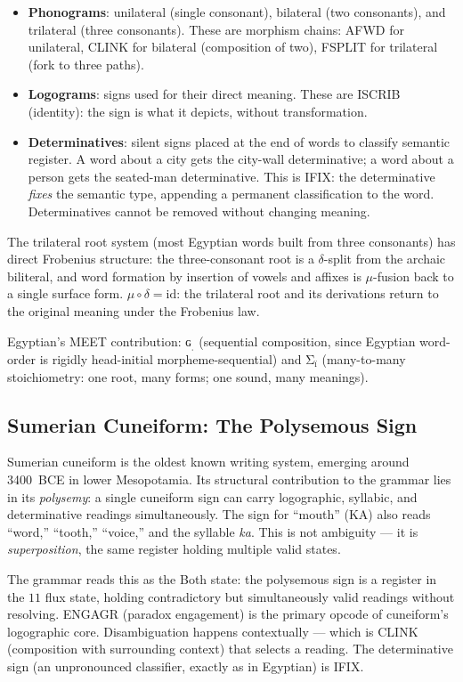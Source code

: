 \documentclass[12pt,a4paper]{article}
\begin{document}
\begin{itemize}
\item \textbf{Phonograms}: unilateral (single consonant), bilateral (two consonants), and trilateral (three consonants). These are morphism chains: AFWD for unilateral, CLINK for bilateral (composition of two), FSPLIT for trilateral (fork to three paths).
\item \textbf{Logograms}: signs used for their direct meaning. These are ISCRIB (identity): the sign is what it depicts, without transformation.
\item \textbf{Determinatives}: silent signs placed at the end of words to classify semantic register. A word about a city gets the city-wall determinative; a word about a person gets the seated-man determinative. This is IFIX: the determinative \emph{fixes} the semantic type, appending a permanent classification to the word. Determinatives cannot be removed without changing meaning.
\end{itemize}

The trilateral root system (most Egyptian words built from three consonants) has direct Frobenius structure: the three-consonant root is a $\delta$-split from the archaic biliteral, and word formation by insertion of vowels and affixes is $\mu$-fusion back to a single surface form. $\mu \circ \delta = \mathrm{id}$: the trilateral root and its derivations return to the original meaning under the Frobenius law.

Egyptian's MEET contribution: $\text{ɢ}_\text{ˌ}$ (sequential composition, since Egyptian word-order is rigidly head-initial morpheme-sequential) and $\text{Σ}_\text{ï}$ (many-to-many stoichiometry: one root, many forms; one sound, many meanings).

\subsection{Sumerian Cuneiform: The Polysemous Sign}

Sumerian cuneiform is the oldest known writing system, emerging around 3400~BCE in lower Mesopotamia. Its structural contribution to the grammar lies in its \emph{polysemy}: a single cuneiform sign can carry logographic, syllabic, and determinative readings simultaneously. The sign for ``mouth'' (KA) also reads ``word,'' ``tooth,'' ``voice,'' and the syllable \emph{ka}. This is not ambiguity --- it is \emph{superposition}, the same register holding multiple valid states.

The grammar reads this as the Both state: the polysemous sign is a register in the $11$ flux state, holding contradictory but simultaneously valid readings without resolving. ENGAGR (paradox engagement) is the primary opcode of cuneiform's logographic core. Disambiguation happens contextually --- which is CLINK (composition with surrounding context) that selects a reading. The determinative sign (an unpronounced classifier, exactly as in Egyptian) is IFIX.
\end{document}
